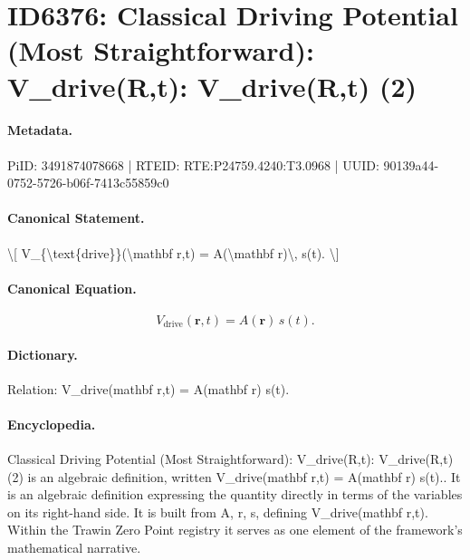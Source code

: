 \section*{ID6376: Classical Driving Potential (Most Straightforward): V\_drive(R,t): V\_drive(R,t) (2)}
\paragraph{Metadata.}
PiID: 3491874078668 | RTEID: RTE:P24759.4240:T3.0968 | UUID: 90139a44-0752-5726-b06f-7413c55859c0

\paragraph{Canonical Statement.}
\textbackslash{}[ V\_\{\textbackslash{}text\{drive\}\}(\textbackslash{}mathbf r,t) = A(\textbackslash{}mathbf r)\textbackslash{}, s(t). \textbackslash{}]

\paragraph{Canonical Equation.}
\[
V_{\text{drive}}(\mathbf r,t) = A(\mathbf r)\, s(t).
\]

\paragraph{Dictionary.}
Relation: V\_drive(mathbf r,t) = A(mathbf r) s(t).

\paragraph{Encyclopedia.}
Classical Driving Potential (Most Straightforward): V\_drive(R,t): V\_drive(R,t) (2) is an algebraic definition, written V\_drive(mathbf r,t) = A(mathbf r) s(t).. It is an algebraic definition expressing the quantity directly in terms of the variables on its right-hand side. It is built from A, r, s, defining V\_drive(mathbf r,t). Within the Trawin Zero Point registry it serves as one element of the framework's mathematical narrative.
